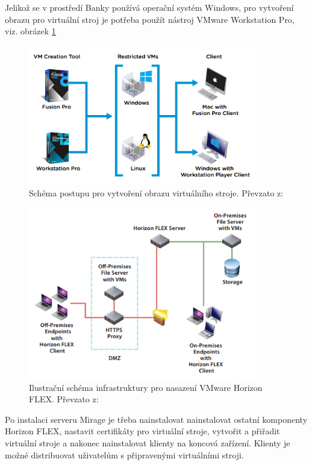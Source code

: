 Jelikož se v prostředí Banky používá operační systém Windows, pro vytvoření obrazu pro virtuální stroj je potřeba použít nástroj VMware Workstation Pro, viz. obrázek \ref{workstation}

\begin{figure}[h!]
\centering
\includegraphics[width=10cm]{img/workstation}
\caption{Schéma postupu pro vytvoření obrazu virtuálního stroje. Převzato z: \cite{FlexDeployment}}
\label{workstation}
\end{figure}%




\begin{figure}[h!]
\centering
\includegraphics[width=10cm]{img/schemaArchitektury}
\caption{Ilustrační schéma infrastruktury pro nasazení VMware Horizon FLEX. Převzato z: \cite{FlexDeployment}}\label{schemaArchitektury}
\end{figure}%


Po instalaci serveru Mirage je třeba nainstalovat nainstalovat ostatní komponenty Horizon FLEX, nastavit certifikáty pro virtuální stroje, vytvořit a přiřadit virtuální stroje a nakonec nainstalovat klienty na koncová zařízení. Klienty je možné distribuovat uživatelům s připravenými virtuálními stroji. 

